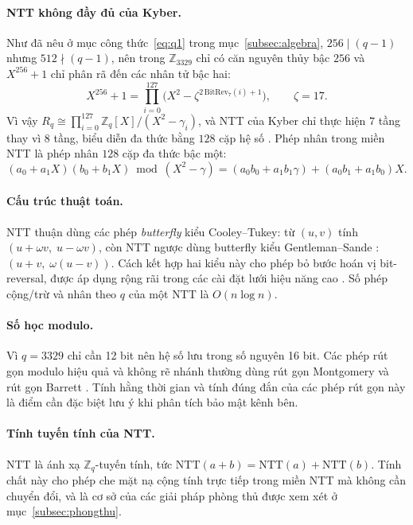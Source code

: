 \documentclass[../LuanVan.tex]{subfiles}
\begin{document}
\paragraph{NTT không đầy đủ của Kyber.} Như đã nêu ở mục công thức~\eqref{eq:q1} trong mục~\ref{subsec:algebra}, $256\mid (q-1)$ nhưng $512\nmid (q-1)$, nên trong $\mathbb{Z}_{3329}$ chỉ có căn nguyên thủy bậc $256$ và $X^{256}+1$ chỉ phân rã đến các nhân tử bậc hai:
\begin{equation}
    X^{256}+1 = \prod_{i=0}^{127}\bigl(X^2 - \zeta^{2\,\mathrm{BitRev}_7(i)+1}\bigr), \qquad \zeta=17 .
\end{equation}
Vì vậy $R_q \cong \prod_{i=0}^{127}\mathbb{Z}_q[X]/(X^2-\gamma_i)$, và NTT của Kyber chỉ thực hiện $7$ tầng thay vì $8$ tầng, biểu diễn đa thức bằng $128$ cặp hệ số \cite{Avanzi21,FIPS203}. Phép nhân trong miền NTT là phép nhân $128$ cặp đa thức bậc một:
\begin{equation}
    (a_0+a_1X)(b_0+b_1X) \bmod (X^2-\gamma) = (a_0b_0 + a_1b_1\gamma) + (a_0b_1+a_1b_0)X .
\end{equation}

\paragraph{Cấu trúc thuật toán.} NTT thuận dùng các phép \textit{butterfly} kiểu Cooley--Tukey: từ $(u,v)$ tính $(u+\omega v,\; u-\omega v)$, còn NTT ngược dùng butterfly kiểu Gentleman--Sande \cite{GentlemanSande66}: $(u+v,\;\omega(u-v))$. Cách kết hợp hai kiểu này cho phép bỏ bước hoán vị bit-reversal, được áp dụng rộng rãi trong các cài đặt lưới hiệu năng cao \cite{Longa16,Seiler18}. Số phép cộng/trừ và nhân theo $q$ của một NTT là $O(n\log n)$.

\paragraph{Số học modulo.} Vì $q=3329$ chỉ cần 12 bit nên hệ số lưu trong số nguyên 16 bit. Các phép rút gọn modulo hiệu quả và không rẽ nhánh thường dùng rút gọn Montgomery \cite{Montgomery85} và rút gọn Barrett \cite{Barrett86}. Tính hằng thời gian và tính đúng đắn của các phép rút gọn này là điểm cần đặc biệt lưu ý khi phân tích bảo mật kênh bên.

\paragraph{Tính tuyến tính của NTT.} NTT là ánh xạ $\mathbb{Z}_q$-tuyến tính, tức $\mathrm{NTT}(a+b)=\mathrm{NTT}(a)+\mathrm{NTT}(b)$. Tính chất này cho phép che mặt nạ cộng tính trực tiếp trong miền NTT mà không cần chuyển đổi, và là cơ sở của các giải pháp phòng thủ được xem xét ở mục~\ref{subsec:phongthu}.
\end{document}
